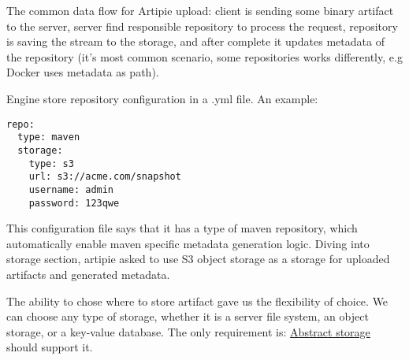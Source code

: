 \documentclass[12pt,oneside]{article}
\begin{document}
The common data flow for Artipie upload: client is sending some binary artifact
to the server, server find responsible repository to process the request,
repository is saving the stream to the storage, and after complete it updates metadata
of the repository (it's most common scenario, some repositories works differently,
e.g Docker uses metadata as path).


\begin{center}
\end{center}

Engine store repository configuration in a .yml file. An example:
\begin{Verbatim}[tabsize=2]
repo:
  type: maven
  storage:
    type: s3
    url: s3://acme.com/snapshot
    username: admin
    password: 123qwe
\end{Verbatim}

This configuration file says that it has a type of maven repository,
which automatically enable maven specific metadata generation logic.
Diving into storage section, artipie asked to use S3 object storage 
as a storage for uploaded artifacts and generated metadata.

The ability to chose where to store artifact gave us the flexibility of choice.
We can choose any type of storage, whether it is a server file system,
an object storage, or a key-value database.
The only requirement is: \hyperref[sec:asto]{Abstract storage} should support it.
\end{document}
